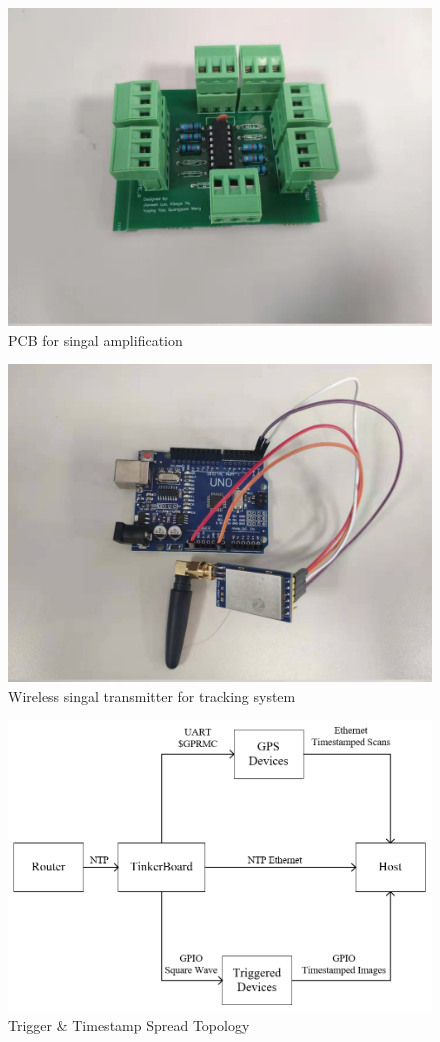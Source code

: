 \documentclass[conference]{IEEEtran}
\begin{document}
	\begin{figure}
		\centering
		\includegraphics[width=.4\textwidth]{pcb.jpg}
		\caption{PCB for singal amplification}
		\label{pcb}
	\end{figure}
	
	\begin{figure}
		\centering
		\includegraphics[width=.4\textwidth]{wireless.jpg}
		\caption{Wireless singal transmitter for tracking system}
		\label{wireless}
	\end{figure}
	
	\begin{figure}
		\centering
		\includegraphics[width=.4\textwidth]{topology.png}
		\caption{Trigger \& Timestamp Spread Topology}
		\label{topology}
	\end{figure}
	
\end{document}
